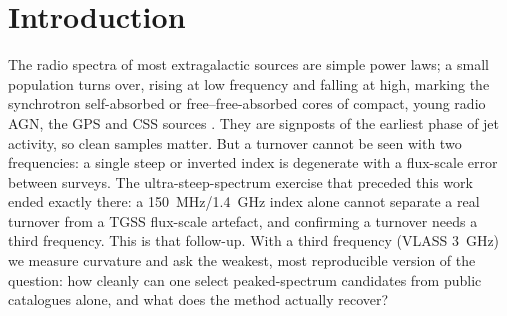 \documentclass[twocolumn]{aastex631}
\begin{document}
\begin{abstract}
nothing). Two literature comparisons calibrate the selection function: against
the GLEAM-selected, MHz-peaked Callingham et al.\ (2017) sample it flags
\pkRealCallLowFlagged\ of \pkRealCallLowTotal\ sources with $\nu_{\rm pk}<250$~MHz and
\pkRealCallMidFlagged/\pkRealCallMidTotal\ at 250--500~MHz (its own claimed window); against
the Dallacasa et al.\ (2000) High-Frequency-Peaker candidate list, using each source's
measured TGSS flux (\pkRealHfpTgssDet\ of \pkRealHfpN\ are TGSS-detected; an earlier version
substituted the survey limit for all of them, which made the test a flux cut that could not
fail), \pkRealHfpRising\% are optically-thick-rising and \pkRealHfpGhz\% still rising at 3~GHz,
while \pkRealHfpFallingLow\% fall from 150~MHz to 1.4~GHz. This is a tooling and methodology
contribution with a published candidate list, not a discovery.
\end{abstract}


\section{Introduction}
The radio spectra of most extragalactic sources are simple power laws; a small population
turns over, rising at low frequency and falling at high, marking the synchrotron
self-absorbed or free--free-absorbed cores of compact, young radio AGN, the GPS and CSS sources
\citep{odea1998,odea2021}. They are signposts of the earliest phase of jet activity, so clean samples
matter. But a turnover cannot be seen with two frequencies: a single steep or inverted index is
degenerate with a flux-scale error between surveys. The ultra-steep-spectrum exercise that preceded this work ended
exactly there: a 150~MHz/1.4~GHz index alone cannot separate a real turnover from
a TGSS flux-scale artefact, and confirming a turnover needs a third frequency. This is that
follow-up. With a third frequency (VLASS 3~GHz) we measure curvature and ask the weakest,
most reproducible version of the question: how cleanly can one select peaked-spectrum candidates
from public catalogues alone, and what does the method actually recover?
\end{document}
